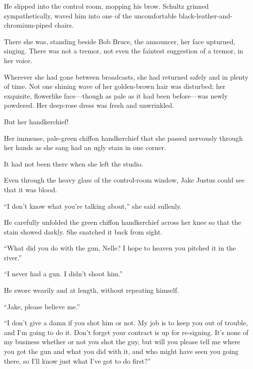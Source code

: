 \documentclass{novel}
\begin{document}
He slipped into the control room, mopping his brow. Schultz grinned sympathetically, waved him into one of the uncomfortable black-leather-and-chromium-piped chairs.

There she was, standing beside Bob Bruce, the announcer, her face upturned, singing. There was not a tremor, not even the faintest suggestion of a tremor, in her voice.

Wherever she had gone between broadcasts, she had returned safely and in plenty of time. Not one shining wave of her golden-brown hair was disturbed; her exquisite, flowerlike face—though as pale as it had been before—was newly powdered. Her deep-rose dress was fresh and unwrinkled.

But her handkerchief!

Her immense, pale-green chiffon handkerchief that she passed nervously through her hands as she sang had an ugly stain in one corner.

It had not been there when she left the studio.

Even through the heavy glass of the control-room window, Jake Justus could see that it was blood.

\vspace{2\nbs}
\clearpage
\thispagestyle{empty}

\begin{ChapterStart}
\vspace{3\nbs}
\end{ChapterStart}

“I don’t know what you’re talking about,” she said sullenly.

He carefully unfolded the green chiffon handkerchief across her knee so that the stain showed darkly. She snatched it back from sight.

“What did you do with the gun, Nelle? I hope to heaven you pitched it in the river.”

“I never had a gun. I didn’t shoot him.”

He swore wearily and at length, without repeating himself.

“Jake, please believe me.”

“I don’t give a damn if you shot him or not. My job is to keep you out of trouble, and I’m going to do it. Don’t forget your contract is up for re-signing. It’s none of my business whether or not you shot the guy, but will you please tell me where you got the gun and what you did with it, and who might have seen you going there, so I’ll know just what I’ve got to do first?”
\end{document}
